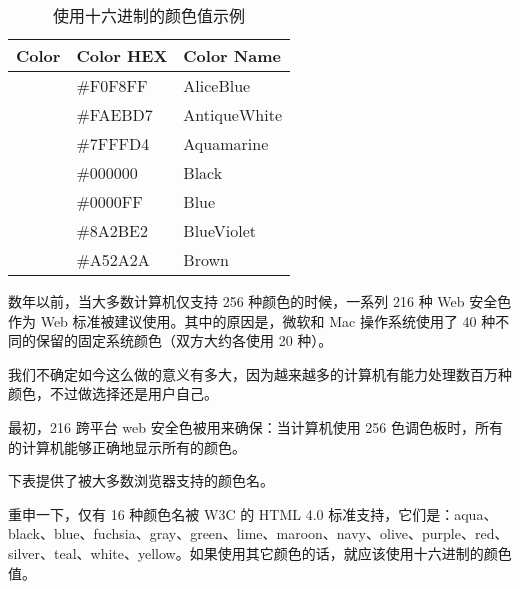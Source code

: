 \begin{table}[!h]
\centering
\caption{使用十六进制的颜色值示例}
\begin{tabular}{|p{100pt}|p{100pt}|p{100pt}|}
\hline
Color				&Color HEX		&Color Name		\\
\hline
\cellcolor{AliceBlue}	&\#F0F8FF		&AliceBlue		\\
\hline
\cellcolor{AntiqueWhite}&\#FAEBD7		&AntiqueWhite	\\
\hline
\cellcolor{Aquamarine}	&\#7FFFD4		&Aquamarine	\\
\hline
\cellcolor{Black}		&\#000000		&Black	\\
\hline
\cellcolor{Blue}		&\#0000FF		&Blue	\\
\hline
\cellcolor{BlueViolet}	&\#8A2BE2		&BlueViolet	\\
\hline
\cellcolor{Brown}		&\#A52A2A		&Brown	\\
\hline
\end{tabular}
\end{table}


数年以前，当大多数计算机仅支持 256 种颜色的时候，一系列 216 种 Web 安全色作为 Web 标准被建议使用。其中的原因是，微软和 Mac 操作系统使用了 40 种不同的保留的固定系统颜色（双方大约各使用 20 种）。

我们不确定如今这么做的意义有多大，因为越来越多的计算机有能力处理数百万种颜色，不过做选择还是用户自己。


最初，216 跨平台 web 安全色被用来确保：当计算机使用 256 色调色板时，所有的计算机能够正确地显示所有的颜色。

下表提供了被大多数浏览器支持的颜色名。

重申一下，仅有 16 种颜色名被 W3C 的 HTML 4.0 标准支持，它们是：aqua、black、blue、fuchsia、gray、green、lime、maroon、navy、olive、purple、red、silver、teal、white、yellow。如果使用其它颜色的话，就应该使用十六进制的颜色值。


